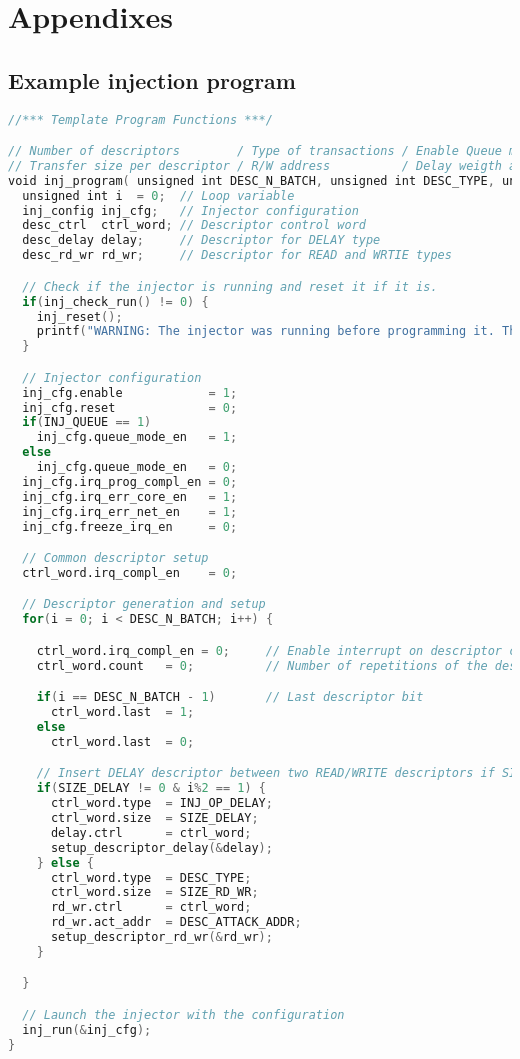 \newpage
\section{Appendixes}
\subsection{Example injection program}
\label{appendix-programexample}

\begin{lstlisting}[language=Verilog, caption=Example injection program function from the bare-metal driver file texttt{injector.c}.]
//*** Template Program Functions ***/

// Number of descriptors        / Type of transactions / Enable Queue mode                      /
// Transfer size per descriptor / R/W address          / Delay weigth after transfer descriptor /
void inj_program( unsigned int DESC_N_BATCH, unsigned int DESC_TYPE, unsigned int INJ_QUEUE, unsigned int SIZE_RD_WR, unsigned int DESC_ATTACK_ADDR, unsigned int SIZE_DELAY ) {
  unsigned int i  = 0;  // Loop variable
  inj_config inj_cfg;   // Injector configuration
  desc_ctrl  ctrl_word; // Descriptor control word
  desc_delay delay;     // Descriptor for DELAY type
  desc_rd_wr rd_wr;     // Descriptor for READ and WRTIE types

  // Check if the injector is running and reset it if it is.
  if(inj_check_run() != 0) {
    inj_reset();
    printf("WARNING: The injector was running before programming it. Thus, it has been reset.\n");
  }

  // Injector configuration
  inj_cfg.enable            = 1;
  inj_cfg.reset             = 0;
  if(INJ_QUEUE == 1)
    inj_cfg.queue_mode_en   = 1;
  else
    inj_cfg.queue_mode_en   = 0;
  inj_cfg.irq_prog_compl_en = 0;
  inj_cfg.irq_err_core_en   = 1;
  inj_cfg.irq_err_net_en    = 1;
  inj_cfg.freeze_irq_en     = 0;

  // Common descriptor setup
  ctrl_word.irq_compl_en    = 0;

  // Descriptor generation and setup
  for(i = 0; i < DESC_N_BATCH; i++) {

    ctrl_word.irq_compl_en = 0;     // Enable interrupt on descriptor completion
    ctrl_word.count   = 0;          // Number of repetitions of the descriptor

    if(i == DESC_N_BATCH - 1)       // Last descriptor bit
      ctrl_word.last  = 1;
    else
      ctrl_word.last  = 0;

    // Insert DELAY descriptor between two READ/WRITE descriptors if SIZE_DELAY has a value
    if(SIZE_DELAY != 0 & i%2 == 1) {
      ctrl_word.type  = INJ_OP_DELAY;
      ctrl_word.size  = SIZE_DELAY;
      delay.ctrl      = ctrl_word;
      setup_descriptor_delay(&delay);
    } else {
      ctrl_word.type  = DESC_TYPE;
      ctrl_word.size  = SIZE_RD_WR;
      rd_wr.ctrl      = ctrl_word;
      rd_wr.act_addr  = DESC_ATTACK_ADDR;
      setup_descriptor_rd_wr(&rd_wr);
    }

  }

  // Launch the injector with the configuration
  inj_run(&inj_cfg);
}

\end{lstlisting}


